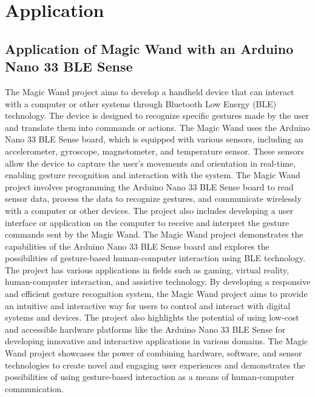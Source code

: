 %
%

\chapter{Application}

\section{Application of Magic Wand with an Arduino Nano 33 BLE Sense}
\label{Application}
The Magic Wand project aims to develop a handheld device that can interact with a computer or other systems through Bluetooth Low Energy (BLE) technology. 
The device is designed to recognize specific gestures made by the user and translate them into commands or actions. 
The Magic Wand uses the Arduino Nano 33 BLE Sense board, which is equipped with various sensors, including an accelerometer, gyroscope, magnetometer, and temperature sensor. 
These sensors allow the device to capture the user's movements and orientation in real-time, enabling gesture recognition and interaction with the system. 
The Magic Wand project involves programming the Arduino Nano 33 BLE Sense board to read sensor data, process the data to recognize gestures, and communicate wirelessly with a computer or other devices. 
The project also includes developing a user interface or application on the computer to receive and interpret the gesture commands sent by the Magic Wand. 
The Magic Wand project demonstrates the capabilities of the Arduino Nano 33 BLE Sense board and explores the possibilities of gesture-based human-computer interaction using BLE technology. 
The project has various applications in fields such as gaming, virtual reality, human-computer interaction, and assistive technology. 
By developing a responsive and efficient gesture recognition system, the Magic Wand project aims to provide an intuitive and interactive way for users to control and interact with digital systems and devices. 
The project also highlights the potential of using low-cost and accessible hardware platforms like the Arduino Nano 33 BLE Sense for developing innovative and interactive applications in various domains. 
The Magic Wand project showcases the power of combining hardware, software, and sensor technologies to create novel and engaging user experiences and demonstrates the possibilities of using gesture-based interaction as a means of human-computer communication. 
